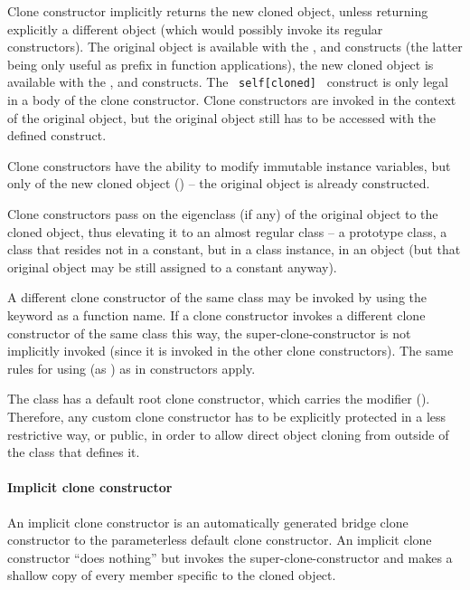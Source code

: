 Clone constructor implicitly returns the new cloned object, unless returning explicitly a different object (which would possibly invoke its regular constructors). The original object is available with the ,  and  constructs (the latter being only useful as prefix in function applications), the new cloned object is available with the ,  and  constructs. The ~\lstinline!self[cloned]!~ construct is only legal in a body of the clone constructor. Clone constructors are invoked in the context of the original object, but the original object still has to be accessed with the defined construct. 

Clone constructors have the ability to modify immutable instance variables, but only of the new cloned object () -- the original object is already constructed. 

Clone constructors pass on the eigenclass (if any) of the original object to the cloned object, thus elevating it to an almost regular class -- a prototype class, a class that resides not in a constant, but in a class instance, in an object (but that original object may be still assigned to a constant anyway). 

A different clone constructor of the same class may be invoked by using the  keyword as a function name. If a clone constructor invokes a different clone constructor of the same class this way, the super-clone-constructor is not implicitly invoked (since it is invoked in the other clone constructors). The same rules for using  (as ) as in constructors apply. 

The  class has a default root clone constructor, which carries the modifier  (). Therefore, any custom clone constructor has to be explicitly protected in a less restrictive way, or public, in order to allow direct object cloning from outside of the class that defines it. 

\paragraph{Implicit clone constructor}
An implicit clone constructor is an automatically generated bridge clone constructor to the parameterless default clone constructor. An implicit clone constructor ``does nothing'' but invokes the super-clone-constructor and makes a shallow copy of every member specific to the cloned object. 


